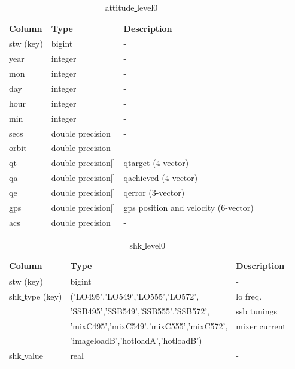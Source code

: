 \documentclass[12pt]{article}
\begin{document}
\begin{table}[ht]
\caption{attitude\underline{ }level0}
\centering
\begin{tabular}{l l l}
\hline\hline
Column & Type & Description \\ [0.5ex]
\hline
stw (key) & bigint             & - \\
year     & integer            & -\\
mon     & integer            & -\\
day     & integer            & -\\
hour    & integer            & -\\
min     & integer            & -\\
secs    & double precision   & -\\
orbit   & double precision   & -\\ 
qt      & double precision[] & qtarget (4-vector)\\
qa      & double precision[] & qachieved (4-vector)\\
qe      & double precision[] & qerror (3-vector)\\
gps     & double precision[] & gps position and velocity (6-vector)\\
acs     & double precision   & -\\[1ex]
\hline
\end{tabular}
\label{table:att0}
\end{table}



\begin{table}[ht]
\caption{shk\underline{ }level0}
\centering
\begin{tabular}{l l l}
\hline\hline
Column & Type & Description \\ [0.5ex]
\hline
stw (key) & bigint & - \\
shk\underline{ }type (key) & ('LO495','LO549','LO555','LO572',  & lo freq.\\
 & 'SSB495','SSB549','SSB555','SSB572', & ssb tunings\\
 & 'mixC495','mixC549','mixC555','mixC572', & mixer current\\
 & 'imageloadB','hotloadA','hotloadB') & \\
shk\underline{ }value & real & -\\[1ex]
\hline
\end{tabular}
\label{table:shk0}
\end{table}
\end{document}
